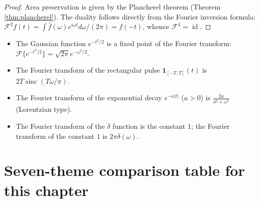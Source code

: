 \begin{proof}
Area preservation is given by the Plancherel theorem (Theorem \ref{thm:plancherel}). The duality follows directly from the Fourier inversion formula: $\mathcal{F}^2f(t)=\int\hat f(\omega)e^{i\omega t}d\omega/(2\pi)=f(-t)$, whence $\mathcal{F}^4=\operatorname{id}$.
\end{proof}

\begin{example}\label{ex:fourier_transform_examples}
\begin{itemize}
    \item The Gaussian function $e^{-t^2/2}$ is a fixed point of the Fourier transform: $\mathcal{F}\{e^{-t^2/2}\}=\sqrt{2\pi}e^{-\omega^2/2}$.
    \item The Fourier transform of the rectangular pulse $\mathbf{1}_{[-T,T]}(t)$ is $2T\operatorname{sinc}(T\omega/\pi)$.
    \item The Fourier transform of the exponential decay $e^{-a|t|}$ ($a>0$) is $\frac{2a}{a^2+\omega^2}$ (Lorentzian type).
    \item The Fourier transform of the $\delta$ function is the constant $1$; the Fourier transform of the constant $1$ is $2\pi\delta(\omega)$.
\end{itemize}
\end{example}

\section*{Seven-theme comparison table for this chapter}

